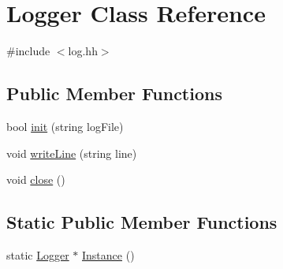\hypertarget{classLogger}{
\section{Logger Class Reference}
\label{classLogger}
}


{\ttfamily \#include $<$log.hh$>$}

\subsection*{Public Member Functions}
\begin{DoxyCompactItemize}
\item 
bool \hyperlink{classLogger_af843738beb6818dedd7156a720141e98}{init} (string logFile)
\item 
void \hyperlink{classLogger_aa958f35a7eeb31a8ea4fff0c0574e029}{writeLine} (string line)
\item 
void \hyperlink{classLogger_afee2bab560c2db0190c980884d33868c}{close} ()
\end{DoxyCompactItemize}
\subsection*{Static Public Member Functions}
\begin{DoxyCompactItemize}
\item 
static \hyperlink{classLogger}{Logger} $\ast$ \hyperlink{classLogger_afae0bf19389387a916656073572cb846}{Instance} ()
\end{DoxyCompactItemize}


